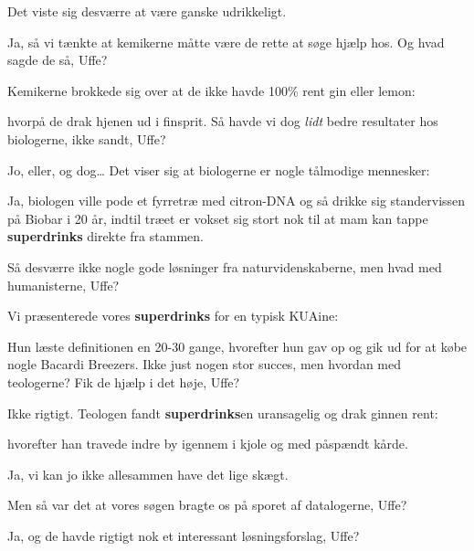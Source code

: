 \documentclass[a4paper,11pt]{article}
\newcommand{\sd}{\textbf{superdrinks}}
\begin{document}
\begin{sketch}
   Det viste sig desværre at være ganske udrikkeligt.
  
   Ja, så vi tænkte at kemikerne måtte være de rette at søge
  hjælp hos. Og hvad sagde de så, Uffe?
  
   Kemikerne brokkede sig over at de ikke havde 100\% rent gin
  eller lemon:
  
  
   hvorpå de drak hjenen ud i finsprit. Så havde vi dog
  \emph{lidt} bedre resultater hos biologerne, ikke sandt, Uffe?
  
   Jo, eller, og dog\ldots{} Det viser sig at biologerne er
  nogle tålmodige mennesker:
  
  
   Ja, biologen ville pode et fyrretræ med citron-DNA og så
  drikke sig standervissen på Biobar i 20 år, indtil træet er vokset
  sig stort nok til at mam kan tappe \sd{} direkte fra stammen.
  
   Så desværre ikke nogle gode løsninger fra
  naturvidenskaberne, men hvad med humanisterne, Uffe?
  
   Vi præsenterede vores \sd{} for en typisk KUAine:
  
  
   Hun læste definitionen en 20-30 gange, hvorefter hun gav op
  og gik ud for at købe nogle Bacardi Breezers. Ikke just nogen stor
  succes, men hvordan med teologerne? Fik de hjælp i det høje, Uffe?
  
   Ikke rigtigt. Teologen fandt \sd{}en uransagelig og drak
  ginnen rent:
  
  
   hvorefter han travede indre by igennem i kjole og med
  påspændt kårde.
  
   Ja, vi kan jo ikke allesammen have det lige skægt.
  
   Men så var det at vores søgen bragte os på sporet af
  datalogerne, Uffe?
  
   Ja, og de havde rigtigt nok et interessant løsningsforslag,
  Uffe?
  

\end{sketch}
\end{document}
